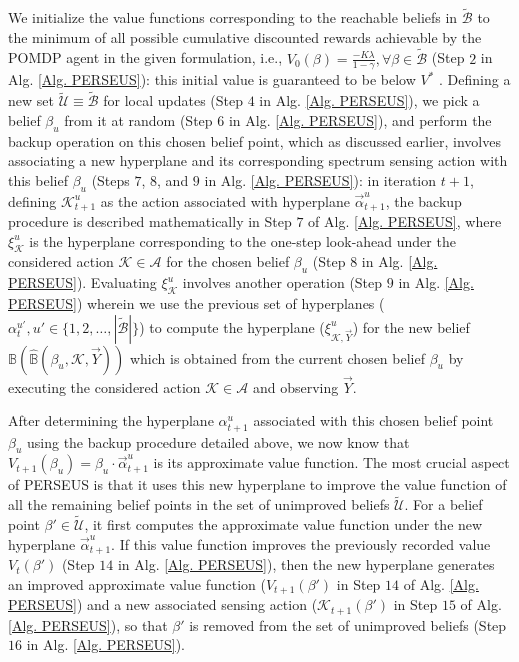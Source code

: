 \documentclass[10pt, twocolumn]{IEEEtran}
\begin{document}
We initialize the value functions corresponding to the reachable beliefs in $\tilde{\mathcal{B}}$ to the minimum of all possible cumulative discounted rewards achievable by the POMDP agent in the given formulation, i.e., $V_{0}(\beta)=\frac{-K\lambda}{1{-}\gamma},{\forall}\beta{\in}\tilde{\mathcal{B}}$ \cite{Zhang_2001} (Step $2$ in Alg. \ref{Alg. PERSEUS}): this initial value is guaranteed to be below $V^{*}$ \cite{WCL:13}. Defining a new set $\tilde{\mathcal{U}}{\equiv}\tilde{\mathcal{B}}$ for local updates (Step $4$ in Alg. \ref{Alg. PERSEUS}), we pick a belief $\beta_{u}$ from it at random (Step $6$ in Alg. \ref{Alg. PERSEUS}), and perform the backup operation on this chosen belief point, which as discussed earlier, involves associating a new hyperplane and its corresponding spectrum sensing action with this belief $\beta_{u}$ (Steps $7$, $8$, and $9$ in Alg. \ref{Alg. PERSEUS}): in iteration $t{+}1$, defining $\mathcal{K}_{t+1}^{u}$ as the action associated with hyperplane $\vec{\alpha}_{t+1}^{u}$, the backup procedure is described mathematically in Step $7$ of Alg. \ref{Alg. PERSEUS}, where $\xi_{\mathcal{K}}^{u}$ is the hyperplane corresponding to the one-step look-ahead under the considered action $\mathcal{K}{\in}\mathcal{A}$ for the chosen belief $\beta_{u}$ (Step $8$ in Alg. \ref{Alg. PERSEUS}). Evaluating $\xi_{\mathcal{K}}^{u}$ involves another operation (Step $9$ in Alg. \ref{Alg. PERSEUS}) wherein we use the previous set of hyperplanes ($\alpha_{t}^{u'},u'{\in}\{1,2,\dots,|\tilde{\mathcal{B}}|\}$) to compute the hyperplane ($\xi_{\mathcal{K},\vec{Y}}^{u}$) for the new belief $\mathbb{B}(\hat{\mathbb{B}}(\beta_{u},\mathcal{K},\vec{Y}))$ which is obtained from the current chosen belief $\beta_{u}$ by executing the considered action $\mathcal{K}{\in}\mathcal{A}$ and observing $\vec{Y}$.

After determining the hyperplane $\alpha_{t+1}^{u}$ associated with this chosen belief point $\beta_{u}$ using the backup procedure detailed above, we now know that $V_{t+1}(\beta_{u}){=}\beta_{u}{\cdot}\vec{\alpha}_{t+1}^{u}$ is its approximate value function. The most crucial aspect of PERSEUS is that it uses this new hyperplane to improve the value function of all the remaining belief points in the set of unimproved beliefs $\tilde{\mathcal{U}}$. For a belief point $\beta'\in\tilde{\mathcal{U}}$, it first computes the approximate value function under the new hyperplane $\vec{\alpha}_{t+1}^{u}$. If this value function improves the previously recorded value $V_{t}(\beta')$ (Step $14$ in Alg. \ref{Alg. PERSEUS}), then the new hyperplane generates an improved approximate value function ($V_{t+1}(\beta')$ in Step $14$ of Alg. \ref{Alg. PERSEUS}) and a new associated sensing action ($\mathcal{K}_{t+1}(\beta')$ in Step $15$ of Alg. \ref{Alg. PERSEUS}), so that $\beta'$ is removed from the set of unimproved beliefs (Step $16$ in Alg. \ref{Alg. PERSEUS}).
\end{document}
